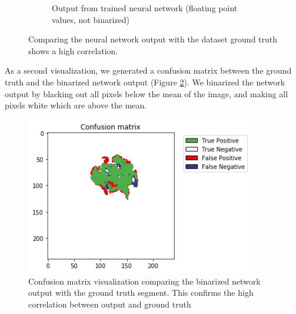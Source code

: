 \begin{figure}[H]
\begin{subfigure}[t]{.5\textwidth}
        \caption{Output from trained neural network (floating point values, not binarized)}
    \end{subfigure}
    \caption{Comparing the neural network output with the dataset ground truth shows a high correlation.}
    \label{brats_evaluation}
\end{figure}

As a second visualization, we generated a confusion matrix between the ground truth and the binarized network output (Figure \ref{brats_confusion_matrix}).
We binarized the network output by blacking out all pixels below the mean of the image, and making all pixels white which are above the mean.

\begin{figure}[H]
\centering
\includegraphics[width=10cm]{chapters/04_segmentation/images/confusion_matrix.png}
\caption{Confusion matrix visualization comparing the binarized network output with the ground truth segment. This confirms the high correlation between output and ground truth}
\label{brats_confusion_matrix}
\end{figure}
